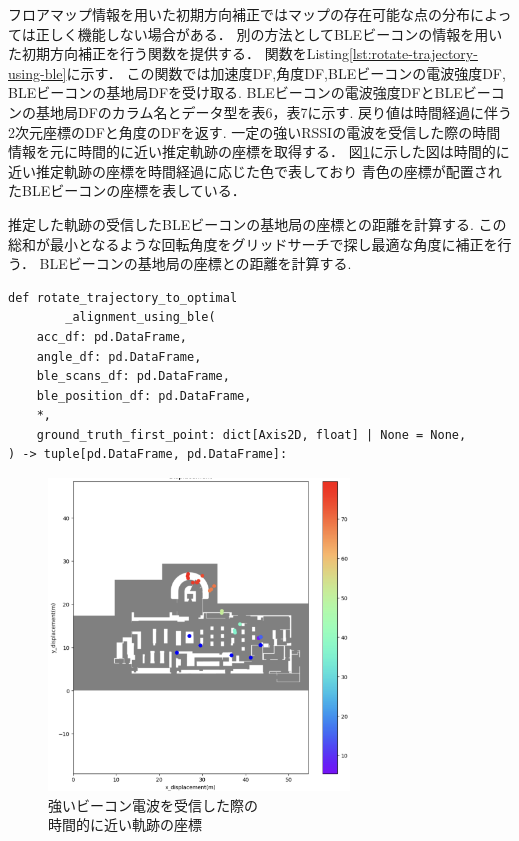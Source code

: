 フロアマップ情報を用いた初期方向補正ではマップの存在可能な点の分布によっては正しく機能しない場合がある．
別の方法としてBLEビーコンの情報を用いた初期方向補正を行う関数を提供する．
関数をListing\ref{lst:rotate-trajectory-using-ble}に示す．
この関数では加速度DF,角度DF,BLEビーコンの電波強度DF, BLEビーコンの基地局DFを受け取る.
BLEビーコンの電波強度DFとBLEビーコンの基地局DFのカラム名とデータ型を表6，表7に示す.
戻り値は時間経過に伴う2次元座標のDFと角度のDFを返す.
一定の強いRSSIの電波を受信した際の時間情報を元に時間的に近い推定軌跡の座標を取得する．
図\ref{fig:ble-merge}に示した図は時間的に近い推定軌跡の座標を時間経過に応じた色で表しており
青色の座標が配置されたBLEビーコンの座標を表している．

推定した軌跡の受信したBLEビーコンの基地局の座標との距離を計算する.
この総和が最小となるような回転角度をグリッドサーチで探し最適な角度に補正を行う．
BLEビーコンの基地局の座標との距離を計算する.

\begin{lstlisting}[caption={BLEを使用した初期方向補正}, label=lst:rotate-trajectory-using-ble]
def rotate_trajectory_to_optimal
		_alignment_using_ble(
    acc_df: pd.DataFrame,
    angle_df: pd.DataFrame,
    ble_scans_df: pd.DataFrame,
    ble_position_df: pd.DataFrame,
    *,
    ground_truth_first_point: dict[Axis2D, float] | None = None,
) -> tuple[pd.DataFrame, pd.DataFrame]:
\end{lstlisting}

\begin{figure}[h]
	\centering
	\includegraphics[width=80mm]{image/ble-merge.jpg}
	\caption{強いビーコン電波を受信した際の\\時間的に近い軌跡の座標}    \label{fig:ble-merge}
\end{figure}

